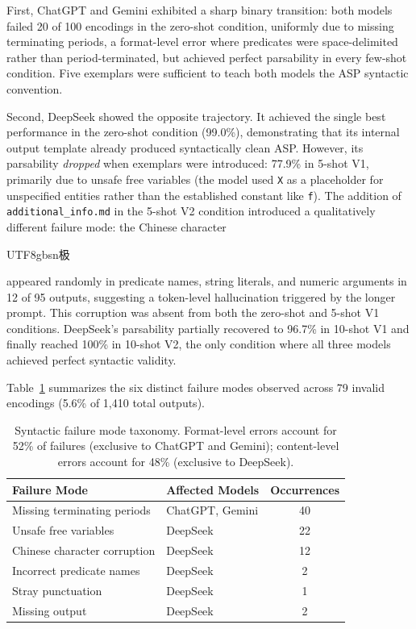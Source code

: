 \documentclass[runningheads]{llncs}
\begin{document}
First, ChatGPT and Gemini exhibited a sharp binary transition: both models
failed 20 of 100 encodings in the zero-shot condition, uniformly due to
missing terminating periods, a format-level error where predicates were
space-delimited rather than period-terminated, but achieved perfect
parsability in every few-shot condition.  Five exemplars were sufficient to
teach both models the ASP syntactic convention.

Second, DeepSeek showed the opposite trajectory.  It achieved the single best
performance in the zero-shot condition (99.0\%), demonstrating that its
internal output template already produced syntactically clean ASP.  However,
its parsability \textit{dropped} when exemplars were introduced: 77.9\% in
5-shot V1, primarily due to unsafe free variables (the model used \texttt{X}
as a placeholder for unspecified entities rather than the established constant like 
\texttt{f}).  The addition of \texttt{additional\_info.md} in the 5-shot V2
condition introduced a qualitatively different failure mode: the
Chinese character \begin{CJK}{UTF8}{gbsn}极\end{CJK} appeared randomly in
predicate names, string literals, and numeric arguments in 12 of 95 outputs,
suggesting a token-level hallucination triggered by the longer prompt.
This corruption was absent from both the zero-shot and 5-shot V1 conditions.
DeepSeek's parsability partially recovered to 96.7\% in 10-shot V1 and
finally reached 100\% in 10-shot V2, the only condition where all three
models achieved perfect syntactic validity.

Table~\ref{tab:fail-modes} summarizes the six distinct failure modes observed
across 79 invalid encodings (5.6\% of 1{,}410 total outputs).

\begin{table}[t]
\centering
\caption{Syntactic failure mode taxonomy.  Format-level errors account for
52\% of failures (exclusive to ChatGPT and Gemini); content-level errors
account for 48\% (exclusive to DeepSeek).}
\label{tab:fail-modes}
\begin{tabular}{@{}llc@{}}
\toprule
\textbf{Failure Mode} & \textbf{Affected Models} & \textbf{Occurrences} \\
\midrule
Missing terminating periods & ChatGPT, Gemini         & 40 \\
Unsafe free variables       & DeepSeek                & 22 \\
Chinese character corruption & DeepSeek               & 12 \\
Incorrect predicate names   & DeepSeek                &  2 \\
Stray punctuation           & DeepSeek                &  1 \\
Missing output              & DeepSeek                &  2 \\
\bottomrule
\end{tabular}
\end{table}
\end{document}
